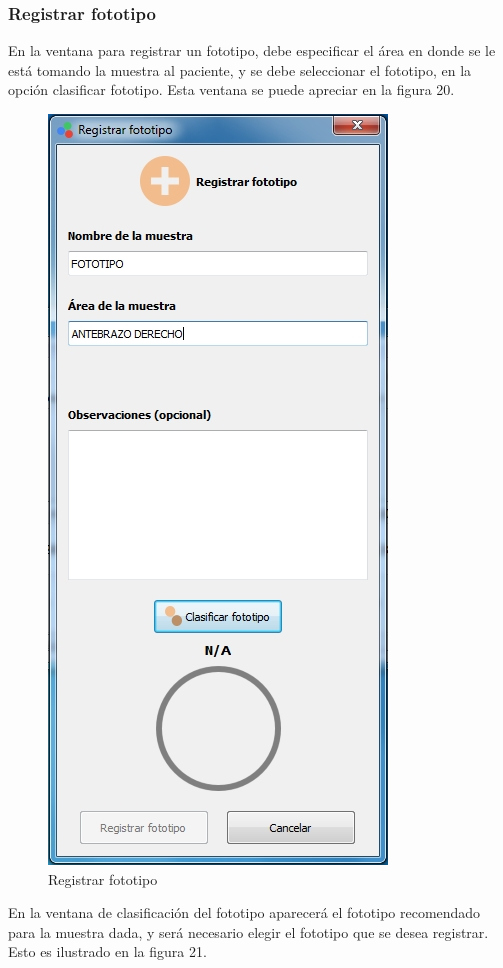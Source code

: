		\subsubsection{Registrar fototipo}
		
		En la ventana para registrar un fototipo, debe especificar el \'{a}rea en donde se le est\'{a} tomando la muestra al paciente, y se debe seleccionar el fototipo, en la opci\'{o}n clasificar fototipo. Esta ventana se puede apreciar en la figura 20.
		
\begin{figure}[H]
  \centering
  \includegraphics[width=.5\linewidth]{./img/registrar-fototipo1.jpg}
\caption{Registrar fototipo}
\end{figure}

		En la ventana de clasificaci\'{o}n del fototipo aparecer\'{a} el fototipo recomendado para la muestra dada, y ser\'{a} necesario elegir el fototipo que se desea registrar. Esto es ilustrado en la figura 21.
		
